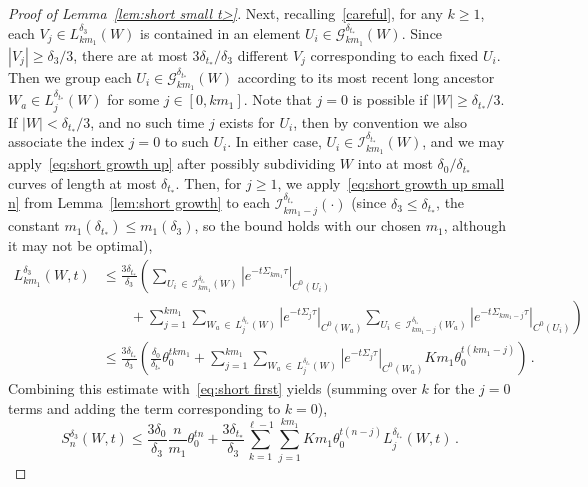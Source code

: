 \documentclass[10pt]{amsart}
\theoremstyle{definition}\newtheorem{defi}[theo]{Definition}\newtheorem{rema}[theo]{Remark}\newtheorem{exam}[theo]{Example}\newtheorem{exem}[theo]{Example}\newtheorem{nota}[theo]{Notation}
\newcommand{\cG}{\mathcal{G}}
\newcommand{\cI}{\mathcal{I}}
\begin{document}
\begin{proof}[Proof of Lemma~\ref{lem:short small t>}]
Next, recalling~\eqref{careful}, for any $k \ge 1$, each $V_j \in L^{\delta_3}_{k m_1}(W)$ is contained in an element $U_i \in \cG_{k m_1}^{\delta_{t_*}}(W)$. Since $|V_j| \ge \delta_3/3$, there are at most $3 \delta_{t_*}/\delta_3$ different $V_j$ corresponding to each fixed $U_i$. Then we group each $U_i \in \cG_{km_1}^{\delta_{t_*}}(W)$ according to its most recent long ancestor $W_a \in L_j^{\delta_{t_*}}(W)$ for some $j \in [0, k m_1]$. Note that $j=0$ is possible if $|W| \ge \delta_{t_*}/3$. If $|W| < \delta_{t_*}/3$, and no such time $j$ exists for $U_i$, then by convention we also associate the index $j=0$ to such $U_i$. In either case, $U_i \in \cI_{km_1}^{\delta_{t_*}}(W)$, and we may apply~\eqref{eq:short growth up} after possibly subdividing $W$ into at most $\delta_0/\delta_{t_*}$ curves of length at most $\delta_{t_*}$. Then, for $j \ge 1$, we apply~\eqref{eq:short growth up small n} from Lemma~\ref{lem:short growth} to each $\cI_{km_1 - j}^{\delta_{t_*}}(\cdot)$ (since $\delta_3 \le \delta_{t_*}$, the constant $m_1(\delta_{t_*}) \le m_1(\delta_3)$, so the bound holds with our chosen $m_1$, although it may not be optimal),
\begingroup
\allowdisplaybreaks
\begin{align*}
L^{\delta_3}_{km_1}(W, t) & \le \frac{3 \delta_{t_*}}{\delta_3}
\left(\sum_{U_i\,\in\,\cI_{km_1}^{\delta_{t_*}}(W) }\left|e^{-t\Sigma_{k m_1} \tau}\right|_{C^0(U_i)} \right.\\
& \qquad +\left.
\sum_{j=1}^{km_1} \sum_{W_a\,\in\,L_j^{\delta_{t_*}}(W)}\left|e^{-t\Sigma_{j} \tau}\right|_{C^0(W_a)} \sum_{U_i\,\in\,\cI_{km_1 -j}^{\delta_{t_*}}(W_a)}\left|e^{-t\Sigma_{k m_1-j} \tau}\right|_{C^0(U_i)} \right) \\
& \le \frac{3 \delta_{t_*}}{\delta_3} \left(\frac{\delta_0}{\delta_{t_*}} \theta_0^{t km_1 } + \sum_{j=1}^{km_1} \sum_{W_a\,\in\,L_j^{\delta_{t_*}}(W)}\left|e^{-t\Sigma_{j} \tau}\right|_{C^0(W_a) } { Km_1 } \theta_0^{t (km_1 - j)} \right) \,.
\end{align*}
\endgroup
Combining this estimate with~\eqref{eq:short first} yields (summing over $k$ for the $j=0$ terms and adding the term corresponding to $k=0$),
\begin{equation}\label{<}
S_n^{\delta_3}(W,t)
\le \frac{3 \delta_0}{\delta_3} \frac{n}{m_1} \theta_0^{t n} +
\frac{3 { \delta_{t_*} } }{\delta_3}
\sum_{k=1}^{\ell-1} \sum_{j=1}^{km_1} { Km_1 } \theta_0^{t (n -j)} L_j^{\delta_{t_*}}(W,t) \,.
\end{equation}


\end{proof}
\end{document}

